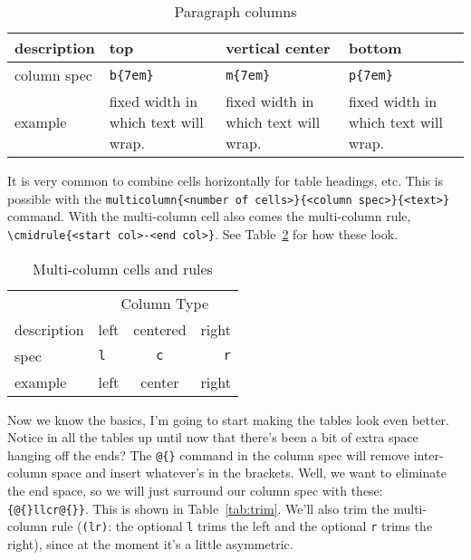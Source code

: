 \documentclass[article,oneside]{memoir}
\begin{document}
\begin{table}[htbp]
  \centering
  \begin{tabular}{lb{7em}m{7em}p{7em}} %
    \toprule
    description & top & vertical center & bottom\\
    \midrule
    column spec & \verb|b{7em}| & \verb|m{7em}| & \verb|p{7em}| \\
    \midrule
    example &%
    fixed width in which text will wrap. &%
    fixed width in which text will wrap. &%
    fixed width in which text will wrap. \\
    \bottomrule
  \end{tabular}
  \caption{Paragraph columns}
  \label{tab:par-col}
\end{table}

It is very common to combine cells horizontally for table headings, etc. This is possible with the \verb|multicolumn{<number of cells>}{<column spec>}{<text>}| command. With the multi-column cell also comes the multi-column rule, \verb|\cmidrule{<start col>-<end col>}|. See Table~\ref{tab:multi-column} for how these look.

\begin{table}[htbp]
  \centering
  \begin{tabular}{llcr} %
    \toprule
    & \multicolumn{3}{c}{Column Type}\\
    \cmidrule{2-4}
    description & left & centered & right\\
    spec & \texttt{l} & \texttt{c} & \texttt{r} \\
    example & left & center & right \\
    \bottomrule
  \end{tabular}
  \caption{Multi-column cells and rules}
  \label{tab:multi-column}
\end{table}

Now we know the basics, I'm going to start making the tables look even better. Notice in all the tables up until now that there's been a bit of extra space hanging off the ends? The \verb|@{}| command in the column spec will remove inter-column space and insert whatever's in the brackets. Well, we want to eliminate the end space, so we will just surround our column spec with these: \verb|{@{}llcr@{}}|. This is shown in Table~\ref{tab:trim}. We'll also trim the multi-column rule (\verb|(lr)|: the optional \verb|l| trims the left and the optional \verb|r| trims the right), since at the moment it's a little asymmetric.
\end{document}
